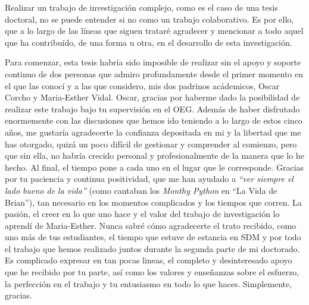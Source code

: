 
\begin{acknowledgementslong} 

Realizar un trabajo de investigación complejo, como es el caso de una tesis doctoral, no se puede entender si no como un trabajo colaborativo. Es por ello, que a lo largo de las líneas que siguen trataré agradecer y mencionar a todo aquel que ha contribuído, de una forma u otra, en el desarrollo de esta investigación.

Para comenzar, esta tesis habría sido imposible de realizar sin el apoyo y soporte continuo de dos personas que admiro profundamente desde el primer momento en el que las conocí y a las que considero, mis dos padrinos acádemicos, Oscar Corcho y Maria-Esther Vidal. Oscar, gracias por haberme dado la posibilidad de realizar este trabajo bajo tu supervisión en el OEG. Además de haber disfrutado enormemente con las discusiones que hemos ido teniendo a lo largo de estos cinco años, me gustaría agradecerte la confianza depositada en mi y la libertad que me has otorgado, quizá un poco difícil de gestionar y comprender al comienzo, pero que sin ella, no habría crecido personal y profesionalmente de la manera que lo he hecho. Al final, el tiempo pone a cada uno en el lugar que le corresponde. Gracias por tu paciencia y continua positividad, que me han ayudado a \textit{``ver siempre el lado bueno de la vida''} (como cantaban los \textit{Monthy Python} en ``La Vida de Brian''), tan necesario en los momentos complicados y los tiempos que corren. La pasión, el creer en lo que uno hace y el valor del trabajo de investigación lo aprendí de Maria-Esther. Nunca sabré cómo agradecerte el trato recibido, como uno más de tus estudiantes, el tiempo que estuve de estancia en SDM y por todo el trabajo que hemos realizado juntos durante la segunda parte de mi doctorado. Es complicado expresar en tan pocas lineas, el completo y desinteresado apoyo que he recibido por tu parte, así como los valores y enseñanzas sobre el esfuerzo, la perfección en el trabajo y tu entusiasmo en todo lo que haces. Simplemente, gracias. 


\end{acknowledgementslong}
